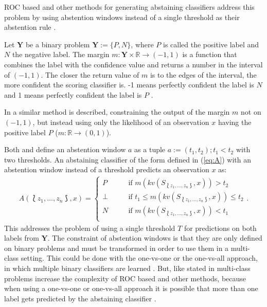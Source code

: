 \documentclass[twoside,11pt]{article}
\def\ds{\Lbag z_1,\dots,z_n \Rbag}
\def\Y{\textbf{Y}}
\begin{document}
ROC based and other methods for generating abstaining
classifiers address this problem by using abstention
windows instead of a single threshold as their abstention
rule \citep[see][]{friedel_et_al_2006}.

Let $\Y$ be a binary problem $\Y := \{P, N\}$,
where $P$ is called the positive label and $N$ the
negative label.
The margin $m: \Y \times \mathbb{R} \rightarrow (-1,1)$ is
a function that combines the label with the confidence
value and returns a number in the interval of $(-1,1)$.
The closer the return value of $m$ is to the edges of the
interval, the more confident the scoring classifier is.
-1 means perfectly confident the label is $N$ and 1
means perfectly confident the label is $P$
\citep[see][]{friedel_et_al_2006}.

In \citet{guan_et_al_2018} a similar method is described,
constraining the output of the margin $m$ not on $(-1,1)$,
but instead using only the likelihood of an observation $x$
having the positive label $P$
($m: \mathbb{R} \rightarrow (0,1)$).

Both \citet{friedel_et_al_2006} and \citet{guan_et_al_2018}
define an abstention window $a$ as a tuple
$a := (t_1, t_2); t_1 < t_2$ with two thresholds.
An abstaining classifier of the form defined in
(\ref{eq:A}) with an abstention window instead of a
threshold predicts an observation $x$ as:
\begin{align*}
  A(\ds, x) =
    \begin{cases}
      P    &\qquad \text{if } m(kv(S_{\ds}, x)) > t_2 \\
      \bot &\qquad \text{if }
            t_1 \leq m(kv(S_{\ds}, x)) \leq t_2 \\
      N    &\qquad \text{if } m(kv(S_{\ds}, x)) < t_1 \\
    \end{cases}.
\end{align*}
This addresses the problem of using a single threshold $T$
for predictions on both labels from $\Y$.
The constraint of abstention windows is that they are only
defined on binary problems and must be transformed in order
to use them in a multi-class setting.
This could be done with the one-vs-one or the one-vs-all
approach, in which multiple binary classifiers are learned
\citep[see e.g.][Chapter 14.5]{murphy_2012}.
But, like stated in \citet{friedel_2005} multi-class
problems increase the complexity of ROC based and other
methods, because when using a one-vs-one or one-vs-all
approach it is possible that more than one label gets
predicted by the abstaining classifier
\citep[see][]{friedel_2005}.
\end{document}

